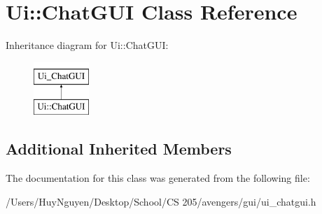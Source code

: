 \hypertarget{classUi_1_1ChatGUI}{}\section{Ui\+:\+:Chat\+G\+UI Class Reference}
\label{classUi_1_1ChatGUI}
Inheritance diagram for Ui\+:\+:Chat\+G\+UI\+:\begin{figure}[H]
\begin{center}
\leavevmode
\includegraphics[height=2.000000cm]{classUi_1_1ChatGUI}
\end{center}
\end{figure}
\subsection*{Additional Inherited Members}


The documentation for this class was generated from the following file\+:\begin{DoxyCompactItemize}
\item 
/\+Users/\+Huy\+Nguyen/\+Desktop/\+School/\+C\+S 205/avengers/gui/ui\+\_\+chatgui.\+h\end{DoxyCompactItemize}
